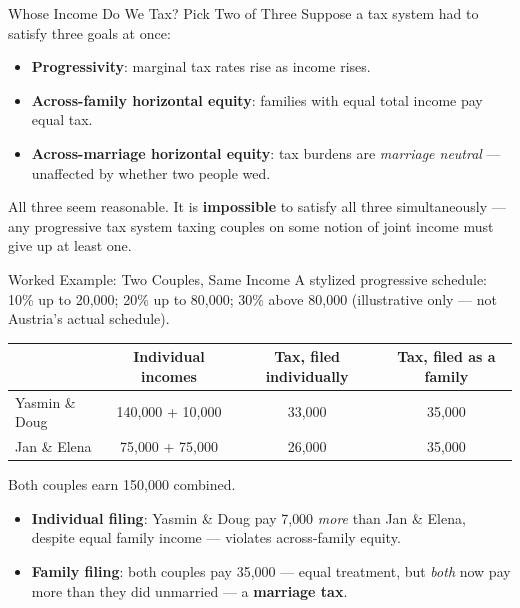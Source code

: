 \documentclass[11pt,aspectratio=169]{beamer}
\begin{document}
\begin{frame}{Whose Income Do We Tax? Pick Two of Three}
	\small
	Suppose a tax system had to satisfy three goals at once:
	\begin{itemize}
		\item \textbf{Progressivity}: marginal tax rates rise as income rises.
		\item \textbf{Across-family horizontal equity}: families with equal total income pay equal tax.
		\item \textbf{Across-marriage horizontal equity}: tax burdens are \emph{marriage neutral} --- unaffected by whether two people wed.
	\end{itemize}
	\vspace{0.3em}

		All three seem reasonable. It is \textbf{impossible} to satisfy all three simultaneously --- any progressive tax system taxing couples on some notion of joint income must give up at least one.


\end{frame}

\begin{frame}{Worked Example: Two Couples, Same Income}
	\footnotesize
	A stylized progressive schedule: 10\% up to \texteuro{}20{,}000; 20\% up to \texteuro{}80{,}000; 30\% above \texteuro{}80{,}000 (illustrative only --- not Austria's actual schedule).
	\vspace{0.3em}
	\begin{center}
		\begin{tabular}{@{}lccc@{}}
			\toprule
			& \textbf{Individual incomes} & \textbf{Tax, filed individually} & \textbf{Tax, filed as a family} \\
			\midrule
			Yasmin \& Doug & \texteuro{}140{,}000 + \texteuro{}10{,}000 & \texteuro{}33{,}000 & \texteuro{}35{,}000 \\
			Jan \& Elena & \texteuro{}75{,}000 + \texteuro{}75{,}000 & \texteuro{}26{,}000 & \texteuro{}35{,}000 \\
			\bottomrule
		\end{tabular}
	\end{center}
	\vspace{0.3em}
	Both couples earn \texteuro{}150{,}000 combined.
	\begin{itemize}
		\item \textbf{Individual filing}: Yasmin \& Doug pay \texteuro{}7{,}000 \emph{more} than Jan \& Elena, despite equal family income --- violates across-family equity.
		\item \textbf{Family filing}: both couples pay \texteuro{}35{,}000 --- equal treatment, but \emph{both} now pay more than they did unmarried --- a \textbf{marriage tax}.
	\end{itemize}

\end{frame}
\end{document}
